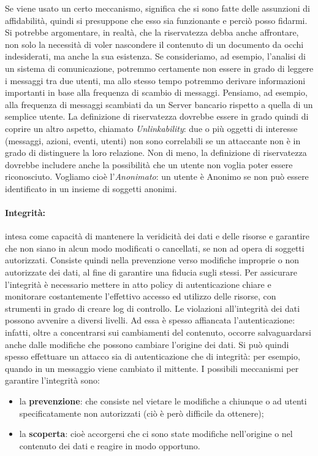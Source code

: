 Se viene usato un certo meccanismo, significa che si sono fatte delle assunzioni
di affidabilità, quindi si presuppone che esso sia funzionante e perciò posso fidarmi.
Si potrebbe argomentare, in realtà, che la riservatezza debba anche affrontare,
non solo la necessità di voler nascondere il contenuto di un documento da occhi
indesiderati, ma anche la sua esistenza. Se consideriamo, ad esempio, l’analisi
di un sistema di comunicazione, potremmo certamente non essere in grado di leggere
i messaggi tra due utenti, ma allo stesso tempo potremmo derivare informazioni
importanti in base alla frequenza di scambio di messaggi.
Pensiamo, ad esempio, alla frequenza di messaggi scambiati da un Server bancario
rispetto a quella di un semplice utente.
La definizione di riservatezza dovrebbe essere in grado quindi di coprire un
altro aspetto, chiamato \textit{Unlinkability}: due o più oggetti di interesse
(messaggi, azioni, eventi, utenti) non sono correlabili se un attaccante non è
in grado di distinguere la loro relazione.
Non di meno, la definizione di riservatezza dovrebbe includere anche la
possibilità che un utente non voglia poter essere riconosciuto. Vogliamo cioè
l'\textit{Anonimato}: un utente è Anonimo se non può essere identificato in
un insieme di soggetti anonimi.

\paragraph{Integrità:}
intesa come capacità di mantenere la veridicità dei dati e delle risorse e
garantire che non siano in alcun modo modificati o cancellati, se non ad opera
di soggetti autorizzati. Consiste quindi nella prevenzione verso modifiche
improprie o non autorizzate dei dati, al fine di garantire una fiducia sugli stessi.
Per assicurare l’integrità è necessario mettere in atto policy di autenticazione
chiare e monitorare costantemente l’effettivo accesso ed utilizzo delle risorse,
con strumenti in grado di creare log di controllo. Le violazioni all’integrità
dei dati possono avvenire a diversi livelli.
Ad essa è spesso affiancata l'autenticazione: infatti, oltre a concentrarsi sui
cambiamenti del contenuto, occorre salvaguardarsi anche dalle modifiche che
possono cambiare l’origine dei dati. Si può quindi spesso effettuare un attacco
sia di autenticazione che di integrità: per esempio, quando in un messaggio viene
cambiato il mittente.
I possibili meccanismi per garantire l'integrità sono:

\begin{itemize}
    \item la \textbf{prevenzione}: che consiste nel vietare le modifiche a
          chiunque o ad utenti
          specificatamente non autorizzati (ciò è però difficile da ottenere);
    \item la \textbf{scoperta}: cioè accorgersi che ci sono state modifiche
          nell'origine o nel contenuto dei dati
          e reagire in modo opportuno.
\end{itemize}

